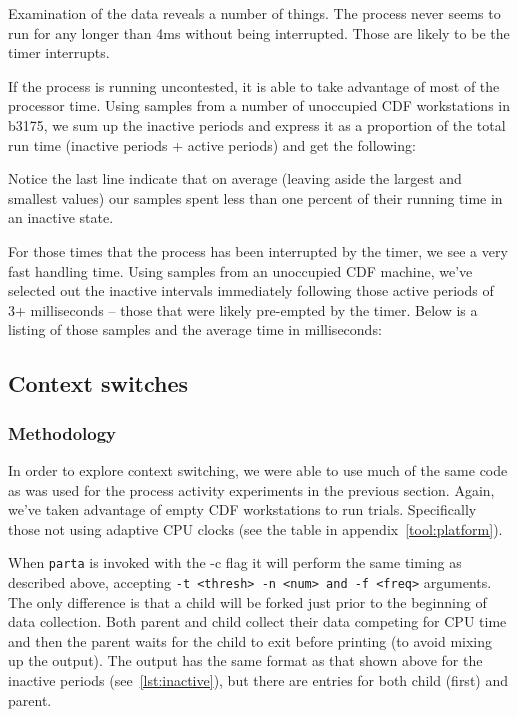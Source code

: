 \documentclass{article}
\begin{document}
Examination of the data reveals a number of things. The process never seems to 
run for any longer than 4ms without being interrupted. Those are likely to be
the timer interrupts.

If the process is running uncontested, it is able to take advantage of most of
the processor time. Using samples from a number of unoccupied CDF workstations
in b3175, we sum up the inactive periods and express it as a proportion of the
total run time (inactive periods + active periods) and get the following:
\begin{framed}
    \label{lst:proportion}
    
\end{framed}
Notice the last line indicate that on average (leaving aside the largest and
smallest values) our samples spent less than one percent of their running time
in an inactive state.

For those times that the process has been interrupted by the timer, we see a
very fast handling time. Using samples from an unoccupied CDF machine,
we've selected out the inactive intervals immediately following those active
periods of 3+ milliseconds -- those that were likely
pre-empted by the timer. Below is a listing of those samples and the average
time in milliseconds:
\begin{framed}
    \label{lst:timer}
    
\end{framed}

\subsection{Context switches}

\subsubsection{Methodology}
In order to explore context switching, we were able to use much of the same
code as was used for the process activity experiments in the previous section.
Again, we've taken advantage of empty CDF workstations to run trials.
Specifically those not using adaptive CPU clocks (see the table in 
appendix~\ref{tool:platform}).

When \lstinline{parta} is invoked with the -c flag it will perform the same
timing as described above, accepting
\lstinline{-t <thresh> -n <num> and -f <freq>} arguments. The only
difference is that a child will be forked just prior to the beginning of
data collection. Both parent and child collect their data competing for
CPU time and then the parent waits for the child to exit before printing
(to avoid mixing up the output). The output has the same format as that shown
above for the inactive periods (see~\ref{lst:inactive}),  but there are entries
for both child (first) and parent.
\end{document}
